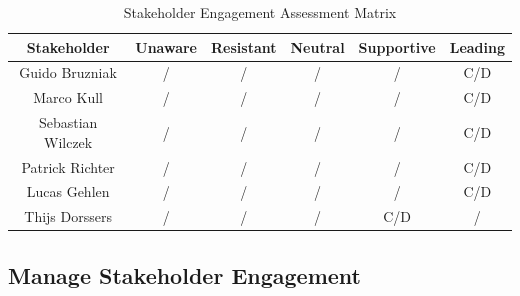  \begin{table}[H]
\centering
\begin{tabular}{|c|c|c|c|c|c|}
\hline
\cellcolor{gray}Stakeholder & \cellcolor{gray}Unaware & 
\cellcolor{gray}Resistant & \cellcolor{gray}Neutral & 
\cellcolor{gray}Supportive & \cellcolor{gray}Leading\\ \hline

Guido Bruzniak & / & / & / & / & C/D \\ \hline
Marco Kull & / & / & / & / & C/D   \\ \hline
Sebastian Wilczek & / & / & / & / & C/D   \\ \hline
Patrick Richter & / & / & / & / & C/D    \\ \hline
Lucas Gehlen & / & / & / & / & C/D   \\ \hline
Thijs Dorssers & / & / & / & C/D  & / \\ \hline

\end{tabular}
\caption{Stakeholder Engagement Assessment Matrix}

\end{table}

\subsection{Manage Stakeholder Engagement}

